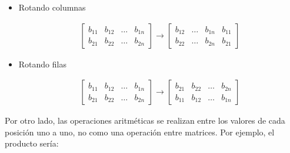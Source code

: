 \begin{itemize}
    \item Rotando columnas
    
    \begin{gather}
        \begin{bmatrix}
            b_{11}  & b_{12}  & \hdots    & b_{1n} \\
            b_{21}  & b_{22}  & \hdots    & b_{2n}
        \end{bmatrix}
        \rightarrow
        \begin{bmatrix}
            b_{12}  & \hdots    & b_{1n}    & b_{11} \\
            b_{22}  & \hdots    & b_{2n}    & b_{21}
        \end{bmatrix}
    \end{gather}
    
    \item Rotando filas
    
    \begin{gather}
        \begin{bmatrix}
            b_{11}  & b_{12}  & \hdots    & b_{1n} \\
            b_{21}  & b_{22}  & \hdots    & b_{2n}
        \end{bmatrix}
        \rightarrow
        \begin{bmatrix}
            b_{21}  & b_{22}  & \hdots    & b_{2n} \\
            b_{11}  & b_{12}  & \hdots    & b_{1n} 
        \end{bmatrix}
    \end{gather}
    
\end{itemize}
%
%
%
%
%
%
%

Por otro lado, las operaciones aritméticas se realizan entre los valores de cada posición uno a uno, no como una operación entre matrices. Por ejemplo, el producto sería:

